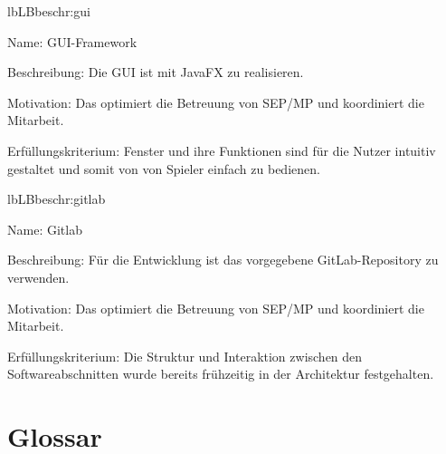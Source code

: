 \begin{description}[leftmargin=5em, style=sameline]
	\begin{lhp}{lb}{LB}{beschr:gui}
		\item [Name:] GUI-Framework
		\item [Beschreibung:] Die GUI ist mit JavaFX zu realisieren.
		\item [Motivation:] Das optimiert die Betreuung von SEP/MP und koordiniert die Mitarbeit.
		\item [Erfüllungskriterium:] Fenster und ihre Funktionen sind für die Nutzer intuitiv gestaltet und somit von von Spieler einfach zu bedienen.
	\end{lhp}
	
	\begin{lhp}{lb}{LB}{beschr:gitlab}
		\item [Name:] Gitlab
		\item [Beschreibung:] Für die Entwicklung ist das vorgegebene GitLab-Repository zu verwenden.
		\item [Motivation:] Das optimiert die Betreuung von SEP/MP und koordiniert die Mitarbeit.
		\item [Erfüllungskriterium:] Die Struktur und Interaktion zwischen den Softwareabschnitten wurde bereits frühzeitig in der Architektur festgehalten.
	\end{lhp}
	
	
\end{description}

\section{Glossar}

